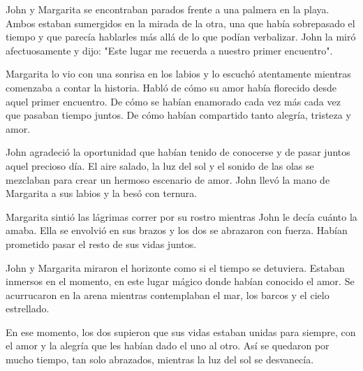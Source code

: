 

John y Margarita se encontraban parados frente a una palmera en la playa. Ambos estaban sumergidos en la mirada de la otra, una que había sobrepasado el tiempo y que parecía hablarles más allá de lo que podían verbalizar. John la miró afectuosamente y dijo: "Este lugar me recuerda a nuestro primer encuentro".

Margarita lo vio con una sonrisa en los labios y lo escuchó atentamente mientras comenzaba a contar la historia. Habló de cómo su amor había florecido desde aquel primer encuentro. De cómo se habían enamorado cada vez más cada vez que pasaban tiempo juntos. De cómo habían compartido tanto alegría, tristeza y amor.

John agradeció la oportunidad que habían tenido de conocerse y de pasar juntos aquel precioso día. El aire salado, la luz del sol y el sonido de las olas se mezclaban para crear un hermoso escenario de amor. John llevó la mano de Margarita a sus labios y la besó con ternura.

Margarita sintió las lágrimas correr por su rostro mientras John le decía cuánto la amaba. Ella se envolvió en sus brazos y los dos se abrazaron con fuerza. Habían prometido pasar el resto de sus vidas juntos.

John y Margarita miraron el horizonte como si el tiempo se detuviera. Estaban inmersos en el momento, en este lugar mágico donde habían conocido el amor. Se acurrucaron en la arena mientras contemplaban el mar, los barcos y el cielo estrellado. 

En ese momento, los dos supieron que sus vidas estaban unidas para siempre, con el amor y la alegría que les habían dado el uno al otro. Así se quedaron por mucho tiempo, tan solo abrazados, mientras la luz del sol se desvanecía.